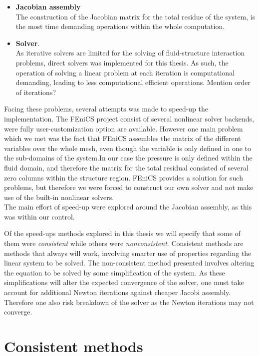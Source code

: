 \begin{itemize}
\item \textbf{Jacobian assembly} \\
The construction of the Jacobian matrix for the total residue of the system, is the most time demanding operations within the whole computation. 
\item \textbf{Solver}. \\ 
As iterative solvers are limited for the solving of fluid-structure interaction problems, direct solvers was implemented for this thesis. As such, the operation of solving a linear problem at each iteration is computational demanding, leading to  less computational efficient operations. Mention order of iterations?
\end{itemize}

Facing these problems, several attempts was made to speed-up the implementation. The FEniCS project consist of several nonlinear solver backends, were fully user-customization option are available. However one main problem which we met was the fact that FEniCS assembles the matrix of the different variables over the whole mesh, even though the variable is only defined in one to the sub-domains of the system.In our case the pressure is only defined within the fluid domain, and therefore the matrix for the total residual consisted of several zero columns within the structure region. FEniCS provides a solution for such problems, but therefore we were forced to construct our own solver and not make use of the built-in nonlinear solvers. \\

The main effort of speed-up were explored around the Jacobian assembly, as this was within our control.  

Of the speed-ups methods explored in this thesis we will specify that some of them were \textit{consistent} while others were \textit{nonconsistent}. Consistent methods are methods that always will work, involving smarter use of properties regarding the linear system to be solved. The non-consistent method presented involves altering the equation to be solved by some simplification of the system. As these simplifications will alter the expected convergence of the solver, one must take account for additional Newton iterations against cheaper Jacobi assembly. Therefore one also risk breakdown of the solver as the Newton iterations may not converge.   


\section{Consistent methods}
